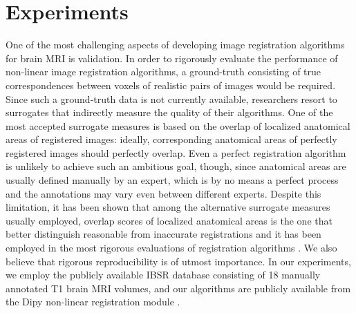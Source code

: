 \section{Experiments}
One of the most challenging aspects of developing image registration algorithms for brain MRI is validation. In order to rigorously evaluate the performance of non-linear
image registration algorithms, a ground-truth consisting of true correspondences between voxels of realistic pairs of images would be required. Since such a ground-truth data is
not currently available, researchers resort to surrogates that indirectly measure the quality of their algorithms. One of the most accepted surrogate measures is based
on the overlap of localized anatomical areas of registered images: ideally, corresponding anatomical areas of perfectly registered images should perfectly
overlap. Even a perfect registration algorithm is unlikely to achieve such an ambitious goal, though, since anatomical areas are usually defined manually by an expert, which is
by no means a perfect process and the annotations may vary even between different experts. Despite this limitation, it has been shown that among the alternative surrogate measures
usually employed, overlap scores of localized anatomical areas is the one that better distinguish reasonable from inaccurate registrations \cite{Rohlfing2012} and it has been employed
in the most rigorous evaluations of registration algorithms \cite{Klein2009}\cite{Klein2010}\cite{Rohlfing2012}. We also believe that rigorous reproducibility is of utmost importance. In our
experiments, we employ the publicly available IBSR database consisting of 18 manually annotated T1 brain MRI volumes, and our algorithms are publicly available from the Dipy
non-linear registration module \cite{Garyfallidis2014}.

